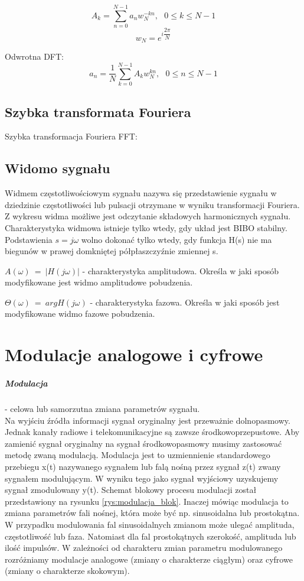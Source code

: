 \documentclass[]{report}
\begin{document}
\begin{equation}
A_{k}=\sum_{n=0}^{N-1}a_{n}w_{N}^{-kn}, ~~~0\le k \le N-1
\end{equation}
\begin{equation}
w_{N}=e^{i\dfrac{2\pi}{N}}
\end{equation}

Odwrotna DFT:
\begin{equation}
a_{n}=\dfrac{1}{N}\sum_{k=0}^{N-1}A_{k}w_{N}^{kn}, ~~~0\le n \le N-1
\end{equation}

\subsection{Szybka transformata Fouriera}
Szybka transformacja Fouriera FFT:

\subsection{Widomo sygnału}
Widmem częstotliwościowym sygnału nazywa się przedstawienie sygnału w dziedzinie częstotliwości lub pulsacji otrzymane w wyniku transformacji Fouriera. Z wykresu widma możliwe jest odczytanie składowych harmonicznych sygnału. Charakterystyka widmowa istnieje tylko wtedy, gdy układ jest BIBO stabilny. Podstawienia  $s = j\omega$ wolno dokonać tylko wtedy, gdy funkcja H(s) nie ma biegunów w prawej domkniętej półpłaszczyźnie zmiennej s.
\medskip 

$A(\omega)~=~|H(j\omega)|$ - charakterystyka amplitudowa. Określa w jaki sposób modyfikowane jest widmo amplitudowe pobudzenia.
\medskip 

$\Theta(\omega)~=~argH(j\omega)$ - charakterystyka fazowa. Określa w jaki sposób jest modyfikowane widmo fazowe pobudzenia.
\section{Modulacje analogowe i cyfrowe}
\subparagraph{Modulacja} - celowa lub samorzutna zmiana parametrów sygnału. \\

Na wyjściu źródła informacji sygnał oryginalny jest przeważnie dolnopasmowy. Jednak kanały radiowe i telekomunikacyjne są zawsze środkowoprzepustowe. Aby zamienić sygnał oryginalny na sygnał środkowopasmowy musimy zastosować metodę zwaną modulacją. Modulacja jest to uzmiennienie standardowego przebiegu x(t) nazywanego sygnałem lub falą nośną przez sygnał z(t) zwany sygnałem modulującym. W wyniku tego jako sygnał wyjściowy uzyskujemy sygnał zmodulowany y(t). Schemat blokowy procesu modulacji został przedstawiony na rysunku \ref{rys:modulacja_blok}. Inaczej mówiąc modulacja to zmiana parametrów fali nośnej, która może być np. sinusoidalna lub prostokątna. W przypadku modulowania fal sinusoidalnych zmianom może ulegać amplituda, częstotliwość lub faza. Natomiast dla fal prostokątnych szerokość, amplituda lub ilość impulsów. W zależności od charakteru zmian parametru modulowanego rozróżniamy modulacje analogowe (zmiany o charakterze ciągłym) oraz cyfrowe (zmiany o charakterze skokowym).
\end{document}
